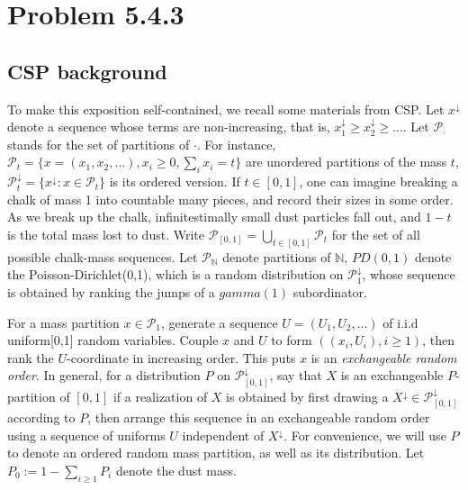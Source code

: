 \section{Problem 5.4.3} 


\subsection{CSP background}
To make this exposition self-contained, we recall some materials from CSP. 
Let $x^\downarrow$ denote a sequence whose terms are non-increasing, that is, $x^\downarrow_1 \geq x^\downarrow_2 \geq \ldots$. Let $\mathcal{P}_{\cdot}$ stands for the set of partitions of $\cdot$. For instance, $\mathcal{P}_t = \{x = (x_1, x_2, \ldots), x_i \geq 0, \sum_ix_i = t\}$ are unordered partitions of the mass $t$, $\mathcal{P}_t^\downarrow = \{x^\downarrow: x \in \mathcal{P}_t\}$
is its ordered version. If $t \in [0,1]$, one can imagine breaking a chalk of mass 1 into countable many pieces, and record their sizes in some order. As we break up the chalk, infinitestimally small dust particles fall out, and $1-t$ is the total mass lost to dust. Write $\mathcal{P}_{[0,1]} = \bigcup_{t \in [0,1]} \mathcal{P}_t$ for the set of all possible chalk-mass sequences. Let $\mathcal{P}_{\mathbb{N}}$ denote partitions of $\mathbb{N}$, $PD(0,1)$ denote the Poisson-Dirichlet(0,1), which is a random distribution on $\mathcal{P}^\downarrow_1$, whose sequence is obtained by ranking the jumps of a $gamma(1)$ subordinator.

For a mass partition $x \in \mathcal{P}_1$, generate a sequence $U = (U_1, U_2, \ldots)$ of i.i.d uniform[0,1] random variables. Couple $x$ and $U$ to form $((x_i,U_i), i \geq 1)$, then rank the $U$-coordinate in increasing order. This puts $x$ is an \emph{exchangeable random order}. In general, for a distribution $P$ on $\mathcal{P}^\downarrow_{[0,1]}$, say that $X$ is an exchangeable $P$-partition of $[0,1]$ if a realization of $X$ is obtained by first drawing a $X^\downarrow \in \mathcal{P}_{[0,1]}^\downarrow$ according to $P$, then arrange this sequence in an exchangeable random order using a sequence of uniforms $U$ independent of $X^\downarrow$. For convenience, we will use $P$ to denote an ordered random mass partition, as well as its distribution. Let $P_0 := 1-\sum_{i\geq 1} P_i$ denote the dust mass. 

